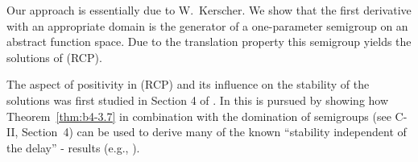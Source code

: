\begin{enumerate}[label=\emph{Section \arabic*:}, wide]
Our approach is essentially due to W.~Kerscher. 
We show that the first derivative with an appropriate domain is the generator of a one-parameter semigroup on an abstract function space. 
Due to the translation property this semigroup yields the solutions of (RCP).

The aspect of positivity in (RCP) and its influence on the stability of the solutions was first studied in Section 4 of \citet{kerschernagel:1984}. 
In \citet{kerscher:1986} this is pursued by showing how Theorem~\ref{thm:b4-3.7} in combination with the domination of semigroups (see C-II, Section~4) can be used to derive many of the known \enquote{stability independent of the delay} - results (e.g., \citet{cookeferreira:1983}).

\end{enumerate}


\RaggedRight





